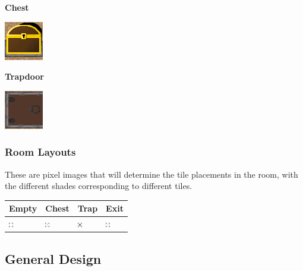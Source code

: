 \documentclass[../Main.tex]{subfiles}
\begin{document}
            \textbf{Chest} \newline
            \centerline{\includegraphics[scale=4]{../res/textures/tiles/Chest.png}}
            \textbf{Trapdoor} \newline
            \centerline{\includegraphics[scale=4]{../res/textures/tiles/Trapdoor.png}}

        \subsubsection{Room Layouts}
            These are pixel images that will determine the tile placements in the room, with the different shades corresponding to different tiles.
            \begin{center}
                \begin{tabular}{ | m{} | m{} | m{} | m{} | }
                    \hline
                    \textbf{Empty} & \textbf{Chest} & \textbf{Trap} & \textbf{Exit} \\
                    \hline
                    \centerline{\includegraphics[scale=40]{../res/rooms/Empty.png}} & \centerline{\includegraphics[scale=40]{../res/rooms/Chest.png}} & \centerline{\includegraphics[scale=40]{../res/rooms/Trap.png}} & \centerline{\includegraphics[scale=40]{../res/rooms/Exit.png}}\\
                    \hline
                \end{tabular}
            \end{center}


    \clearpage
    \subsection{General Design}
\end{document}
